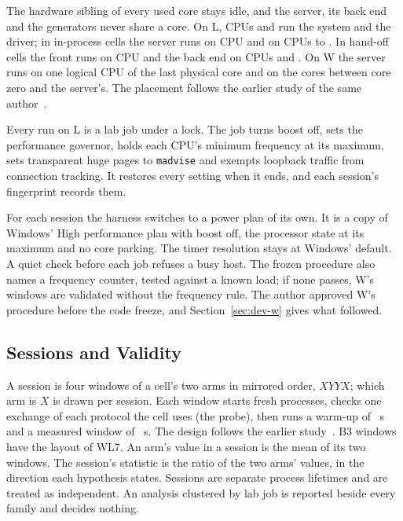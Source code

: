  The hardware sibling of every used core stays idle, and the server, its back end
and the generators never share a core. On L, CPUs \PlaceSysA{} and \PlaceSysB{} run the system and
the driver; in in-process cells the server runs on CPU \PlaceInprocServer{} and \opgen{} on CPUs
\PlaceInprocGenLo{} to \PlaceInprocGenHi. In hand-off cells the front runs on CPU \PlaceFront{} and
the back end on CPUs \PlaceBackA{} and \PlaceBackB. On W the server runs on one logical CPU of the
last physical core and \opgen{} on the cores between core zero and the server's. The placement
follows the earlier study of the same author~\cite{tsvetanov2026routing}.

 Every run on L is a lab job under a lock. The job turns boost off, sets the performance
governor, holds each CPU's minimum frequency at its maximum, sets transparent huge pages to
\texttt{madvise} and exempts loopback traffic from connection tracking. It restores every setting
when it ends, and each session's fingerprint records them.

 For each session the harness switches to a power plan of its own. It is a copy of
Windows' High performance plan with boost off, the processor state at its maximum and no core
parking. The
timer resolution stays at Windows' default. A quiet check before each job refuses a busy host. The
frozen procedure also names a frequency counter, tested against a known load; if none passes, W's
windows are validated without the frequency rule. The author approved W's procedure before the code
freeze, and Section~\ref{sec:dev-w} gives what followed.

\subsection{Sessions and Validity}\label{sec:sessions}

A session is four windows of a cell's two arms in mirrored order, $XYYX$; which arm is $X$ is
drawn per session. Each window starts fresh processes, checks one exchange of each protocol the
cell uses (the probe), then runs a warm-up of \WarmupS{}~s and a measured window of
\MeasureS{}~s. The design follows the earlier study~\cite{tsvetanov2026routing}. B3 windows have
the layout of WL7. An arm's value in a session is the mean of its two windows. The session's
statistic is the ratio of the two arms' values, in the direction each hypothesis states. Sessions
are separate process lifetimes and are treated as independent. An analysis clustered by lab job
is reported beside every family and decides nothing.

